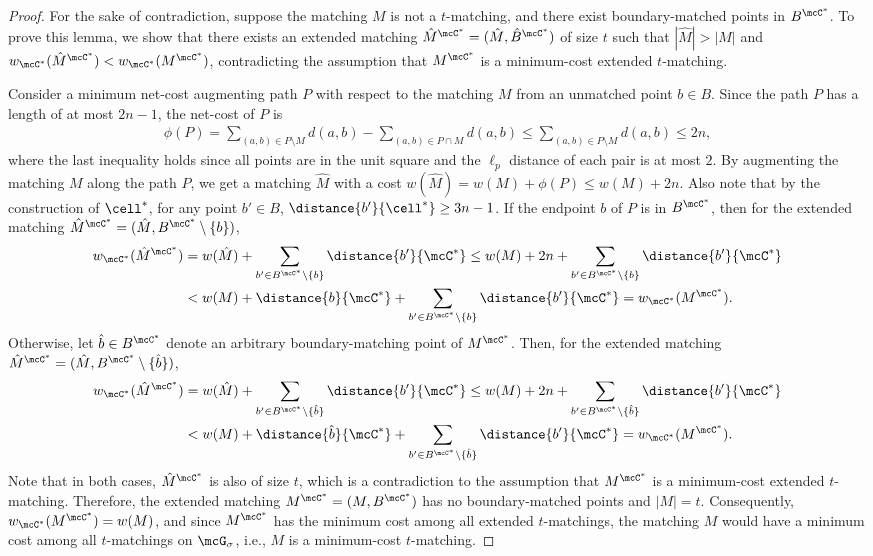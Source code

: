 \rootinactive*
\begin{proof}
    For the sake of contradiction, suppose the matching $M$ is not a $t$-matching, and there exist boundary-matched points in $B^{\mcC^*}$. To prove this lemma, we show that there exists an extended matching $\hat{M}^{\mcC^*}=(\hat{M}, \hat{B}^{\mcC^*})$ of size $t$ such that $|\hat{M}|>|M|$ and $w_{\mcC^*}(\hat{M}^{\mcC^*})<w_{\mcC^*}(M^{\mcC^*})$, contradicting the assumption that $M^{\mcC^*}$ is a minimum-cost extended $t$-matching. 

    Consider a minimum net-cost augmenting path $P$ with respect to the matching $M$ from an unmatched point $b\in B$. Since the path $P$ has a length of at most $2n-1$, the net-cost of $P$ is 
    \begin{align*}
        \phi(P) = \sum_{(a,b)\in P\setminus M}d(a,b) - \sum_{(a,b)\in P\cap M}d(a,b) \le \sum_{(a,b)\in P\setminus M}d(a,b) \le 2n,  
    \end{align*}
    where the last inequality holds since all points are in the unit square and the $\ell_p$ distance of each pair is at most $2$. By augmenting the matching $M$ along the path $P$, we get a matching $\hat{M}$ with a cost $w(\hat{M})=w(M)+\phi(P)\le w(M) + 2n$. Also note that by the construction of $\cell^*$, for any point $b'\in B$, $\distance{b'}{\cell^*}\ge 3n-1$. If the endpoint $b$ of $P$ is in $B^{\mcC^*}$, then for the extended matching $\hat{M}^{\mcC^*}=(\hat{M}, B^{\mcC^*}\setminus\{b\})$, 
    \begin{align*}
        w_{\mcC^*}(\hat{M}^{\mcC^*})&= w(\hat{M}) + \sum_{b'\in B^{\mcC^*}\setminus\{b\} }\distance{b'}{\mcC^*}
        \le w(M) + 2n + \sum_{b'\in B^{\mcC^*}\setminus\{b\} }\distance{b'}{\mcC^*}\\&<w(M) + \distance{b}{\mcC^*} + \sum_{b'\in B^{\mcC^*}\setminus\{b\}}\distance{b'}{\mcC^*}=
        w_{\mcC^*}(M^{\mcC^*}).
    \end{align*}
    Otherwise, let $\hat{b}\in B^{\mcC^*}$ denote an arbitrary boundary-matching point of $M^{\mcC^*}$. Then, for the extended matching $\hat{M}^{\mcC^*}=(\hat{M}, B^{\mcC^*}\setminus\{\hat{b}\})$, 
    \begin{align*}
        w_{\mcC^*}(\hat{M}^{\mcC^*})&= w(\hat{M}) + \sum_{b'\in B^{\mcC^*}\setminus\{\hat{b}\} }\distance{b'}{\mcC^*}
        \le w(M) + 2n + \sum_{b'\in B^{\mcC^*}\setminus\{\hat{b}\} }\distance{b'}{\mcC^*}\\&<w(M) + \distance{\hat{b}}{\mcC^*} + \sum_{b'\in B^{\mcC^*}\setminus\{\hat{b}\}}\distance{b'}{\mcC^*}=
        w_{\mcC^*}(M^{\mcC^*}).
    \end{align*}
    Note that in both cases, $\hat{M}^{\mcC^*}$ is also of size $t$, which is a contradiction to the assumption that $M^{\mcC^*}$ is a minimum-cost extended $t$-matching. Therefore, the extended matching $M^{\mcC^*}=(M, B^{\mcC^*})$ has no boundary-matched points and $|M| = t$. 
    Consequently, $w_{\mcC^*}(M^{\mcC^*}) = w(M)$, and since $M^{\mcC^*}$ has the minimum cost among all extended $t$-matchings, the matching $M$ would have a minimum cost among all $t$-matchings on $\mcG_\sigma$, i.e., $M$ is a minimum-cost $t$-matching.
\end{proof}
%
%
    
